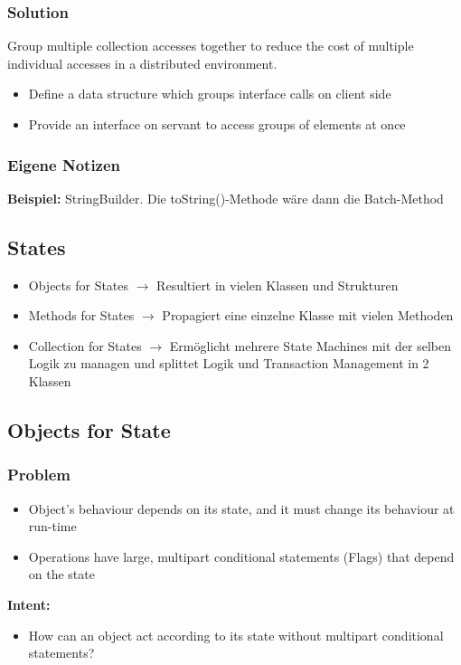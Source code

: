 \subsubsection{Solution}
Group multiple collection accesses together to reduce the cost of multiple individual accesses in a distributed environment.
\begin{itemize}[topsep=0pt]
    \itemsep -0.4em
    \item Define a data structure which groups interface calls on client side
    \item Provide an interface on servant to access groups of elements at once
\end{itemize}
\subsubsection{Eigene Notizen}
\textbf{Beispiel:} StringBuilder. Die toString()-Methode wäre dann die Batch-Method

\subsection{States}
\begin{itemize}[topsep=0pt]
    \itemsep -0.4em
    \item Objects for States $\rightarrow$ Resultiert in vielen Klassen und Strukturen
    \item Methods for States $\rightarrow$ Propagiert eine einzelne Klasse mit vielen Methoden
    \item Collection for States $\rightarrow$ Ermöglicht mehrere State Machines mit der selben Logik zu managen und splittet Logik und Transaction Management in 2 Klassen
\end{itemize}

\subsection{Objects for State}
\subsubsection{Problem}
\begin{itemize}[topsep=0pt]
    \itemsep -0.4em
    \item Object's behaviour depends on its state, and it must change its behaviour at run-time
    \item Operations have large, multipart conditional statements (Flags) that depend on the state
\end{itemize}
\textbf{Intent:}
\begin{itemize}[topsep=0pt]
    \itemsep -0.4em
    \item How can an object act according to its state without multipart conditional statements?
\end{itemize}
